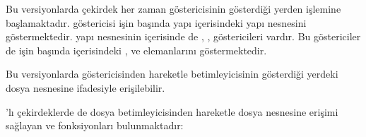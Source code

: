 \documentclass[a4paper,10pt,turkish]{sphinxmanual}
\begin{document}
\sphinxAtStartPar
Bu versiyonlarda çekirdek her zaman  göstericisinin gösterdiği yerden işlemine
başlamaktadır.  göstericisi işin başında yapı içerisindeki  yapı nesnesini
göstermektedir.  yapı nesnesinin içerisinde de , , 
göstericileri vardır. Bu göstericiler de işin başında  içerisindeki ,
 ve  elemanlarını göstermektedir.

\sphinxAtStartPar
Bu versiyonlarda  göstericisinden hareketle  betimleyicisinin gösterdiği
yerdeki dosya nesnesine  ifadesiyle erişilebilir.

’lı çekirdeklerde de dosya betimleyicisinden hareketle dosya nesnesine erişimi sağlayan
 ve  fonksiyonları bulunmaktadır:

\begin{sphinxVerbatim}[commandchars=\\\{\}]
\end{sphinxVerbatim}

\begin{sphinxVerbatim}[commandchars=\\\{\}]
\end{sphinxVerbatim}
\end{document}
